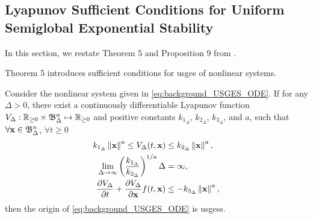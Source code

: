 \subsection{Lyapunov Sufficient Conditions for Uniform Semiglobal Exponential Stability}
In this section, we restate Theorem 5 and Proposition 9 from \cite{pettersen_lyapunov_2017}.

Theorem 5 introduces sufficient conditions for \acrfull{usges} of nonlinear systems.
\begin{theorem}
    \label{thm:background_USGES}
    Consider the nonlinear system given in \eqref{eq:background_USGES_ODE}.
    If for any $\Delta > 0$, there exist a continuously differentiable Lyapunov function $V_{\Delta} : \mathbb{R}_{\geq 0} \times \mathfrak{B}_{\Delta}^{n} \mapsto \mathbb{R}_{\geq 0}$ and positive constants $k_{1_\Delta}$, $k_{2_\Delta}$, $k_{3_\Delta}$, and $a$, such that $\forall \mathbf{x} \in \mathfrak{B}_{\Delta}^{n}$, $\forall t \geq 0$
    \begin{subequations}
        \begin{align}
            k_{1_\Delta} \left\|\mathbf{x}\right\|^a \leq V_{\Delta}(t, \mathbf{x}) &\leq k_{2_\Delta} \left\|\mathbf{x}\right\|^a, \\
            \lim_{\Delta \rightarrow \infty} \left(\frac{k_{1_\Delta}}{k_{2_\Delta}}\right)^{1/a} \Delta &= \infty, \\
            \frac{\partial V_{\Delta}}{\partial t} + \frac{\partial V_{\Delta}}{\partial \mathbf{x}} f(t, \mathbf{x}) &\leq -k_{3_\Delta} \left\|\mathbf{x}\right\|^a,
        \end{align}
    \end{subequations}
    then the origin of \eqref{eq:background_USGES_ODE} is \glspl{usges}.
\end{theorem}

